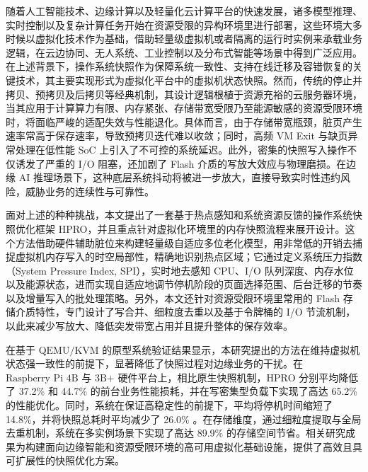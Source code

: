 
\begin{cabstract}
随着人工智能技术、边缘计算以及轻量化云计算平台的快速发展，诸多模型推理、实时控制以及复杂计算任务开始在资源受限的异构环境里进行部署，这些环境大多时候以虚拟化技术作为基础，借助轻量级虚拟机或者隔离的运行时实例来承载业务逻辑，在云边协同、无人系统、工业控制以及分布式智能等场景中得到广泛应用。在上述背景下，操作系统快照作为保障系统一致性、支持在线迁移及容错恢复的关键技术，其主要实现形式为虚拟化平台中的虚拟机状态快照。然而，传统的停止并拷贝、预拷贝及后拷贝等经典机制，其设计逻辑根植于资源充裕的云服务器环境，当其应用于计算算力有限、内存紧张、存储带宽受限乃至能源敏感的资源受限环境时，将面临严峻的适配失效与性能退化。具体而言，由于存储带宽瓶颈，脏页产生速率常高于保存速率，导致预拷贝迭代难以收敛；同时，高频 VM Exit 与缺页异常处理在低性能 SoC 上引入了不可控的系统延迟。此外，密集的快照写入操作不仅诱发了严重的 I/O 阻塞，还加剧了 Flash 介质的写放大效应与物理磨损。在边缘 AI 推理场景下，这种底层系统抖动将被进一步放大，直接导致实时性违约风险，威胁业务的连续性与可靠性。

面对上述的种种挑战，本文提出了一套基于热点感知和系统资源反馈的操作系统快照优化框架 HPRO，并且重点针对虚拟化环境里的内存快照流程来展开设计。这个方法借助硬件辅助脏位来构建轻量级自适应多位老化模型，用非常低的开销去捕捉虚拟机内存写入的时空局部性，精确地识别热点区域；它通过定义系统压力指数（System Pressure Index, SPI），实时地去感知 CPU、I/O 队列深度、内存水位以及能源状态，进而实现自适应地调节停机阶段的页面选择范围、后台迁移的节奏以及增量写入的批处理策略。另外，本文还针对资源受限环境里常用的 Flash 存储介质特性，专门设计了写合并、细粒度去重以及基于令牌桶的 I/O 节流机制，以此来减少写放大、降低突发带宽占用并且提升整体的保存效率。

在基于 $\text{QEMU/KVM}$ 的原型系统验证结果显示，本研究提出的方法在维持虚拟机状态强一致性的前提下，显著降低了快照过程对边缘业务的干扰。在 $\text{Raspberry Pi 4B}$ 与 $\text{3B+}$ 硬件平台上，相比原生快照机制，$\text{HPRO}$ 分别平均降低了 37.2\% 和 44.7\% 的前台业务性能损耗，并在写密集型负载下实现了高达 65.2\% 的性能优化。同时，系统在保证高稳定性的前提下，平均将停机时间缩短了 14.8\%，并将快照总耗时平均减少了 26.0\% 。在存储维度，通过细粒度提取与全局去重机制，系统在多实例场景下实现了高达 89.9\% 的存储空间节省。相关研究成果为构建面向边缘智能和资源受限环境的高可用虚拟化基础设施，提供了高效且具可扩展性的快照优化方案。
\end{cabstract}

